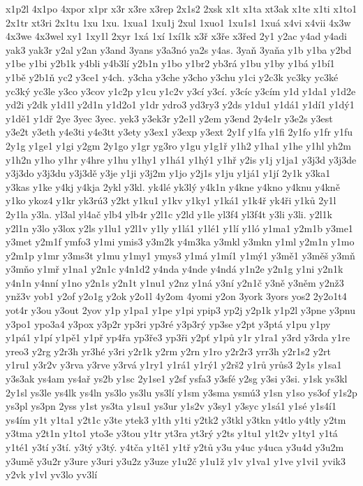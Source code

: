 x1p2l
4x1po
4xpor
x1pr
x3r
x3re
x3rep
2x1s2
2xsk
x1t
x1ta
xt3ak
x1te
x1ti
x1to1
2x1tr
xt3ri
2x1tu
1xu
1xu.
1xua1
1xu1j
2xul
1xuo1
1xu1s1
1xuá
x4vi
x4vii
4x3w
4x3we
4x3wel
xy1
1xy1l
2xyr
1xá
1xí
1xí1k
x3ř
x3ře
x3řed
2y1
y2ac
y4ad
y4adi
yak3
yak3r
y2al
y2an
y3and
3yans
y3a3nó
ya2s
y4as.
3yaň
3yaňa
y1b
y1ba
y2bd
y1be
y1bi
y2b1k
y4bli
y4b3lí
y2b1n
y1bo
y1br2
yb3rá
y1bu
y1by
y1bá
y1bí1
y1bě
y2b1ň
yc2
y3ce1
y4ch.
y3cha
y3che
y3cho
y3chu
y1ci
y2c3k
yc3ky
yc3ké
yc3ký
yc3le
y3co
y3cov
y1c2p
y1cu
y1c2v
y3cí
y3cí.
y3cíc
y3cím
y1d
y1da1
y1d2e
yd2i
y2dk
y1d1l
y2d1n
y1d2o1
y1dr
ydro3
yd3ry3
y2ds
y1du1
y1dá1
y1dí1
y1dý1
y1dě1
y1dř
2ye
3yec
3yec.
yek3
y3ek3r
y2e1l
y2em
y3end
2y4e1r
y3e2s
y3est
y3e2t
y3eth
y4e3ti
y4e3tt
y3ety
y3ex1
y3exp
y3ext
2y1f
y1fa
y1fi
2y1fo
y1fr
y1fu
2y1g
y1ge1
y1gi
y2gm
2y1go
y1gr
yg3ro
y1gu
y1g1ř
y1h2
y1ha1
y1he
y1hl
yh2m
y1h2n
y1ho
y1hr
y4hre
y1hu
y1hy1
y1há1
y1hý1
y1hř
y2is
y1j
y1ja1
y3j3d
y3j3de
y3j3do
y3j3du
y3j3dě
y3je
y1ji
y3j2m
y1jo
y2j1s
y1ju
y1já1
y1jí
2y1k
y3ka1
y3kas
y1ke
y4kj
y4kja
2ykl
y3kl.
yk4lé
yk3lý
y4k1n
y4kne
y4kno
y4knu
y4kně
y1ko
ykoz4
y1kr
yk3rú3
y2kt
y1ku1
y1kv
y1ky1
y1ká1
y1k4ř
yk4ři
y1ků
2y1l
2y1la
y3la.
yl3al
yl4ač
ylb4
ylb4r
y2l1c
y2ld
y1le
yl3f4
yl3f4t
y3li
y3li.
y2l1k
y2l1n
y3lo
y3lox
y2ls
y1lu1
y2l1v
y1ly
y1lá1
y1lé1
y1lí
y1ló
y1ma1
y2m1b
y3me1
y3met
y2m1f
ymfo3
y1mi
ymis3
y3m2k
y4m3ka
y3mkl
y3mkn
y1ml
y2m1n
y1mo
y2m1p
y1mr
y3ms3t
y1mu
y1my1
ymys3
y1má
y1mí1
y1mý1
y3mě1
y3měš
y3mň
y3mňo
y1mř
y1na1
y2n1c
y4n1d2
y4nda
y4nde
y4ndá
y1n2e
y2n1g
y1ni
y2n1k
y4n1n
y4nní
y1no
y2n1s
y2n1t
y1nu1
y2nz
y1ná
y3ní
y2n1č
y3ně
y3něm
y2nž3
ynž3v
yob1
y2of
y2o1g
y2ok
y2o1l
4y2om
4yomi
y2on
3york
3yors
yos2
2y2o1t4
yot4r
y3ou
y3out
2yov
y1p
y1pa1
y1pe
y1pi
ypip3
yp2j
y2p1k
y1p2l
y3pne
y3pnu
y3po1
ypo3a4
y3pox
y3p2r
yp3ri
yp3ré
y3p3rý
yp3se
y2pt
y3ptá
y1pu
y1py
y1pá1
y1pí
y1pě1
y1př
yp4řa
yp3ře3
yp3ři
y2pť
y1pů
y1r
y1ra1
y3rd
y3rda
y1re
yreo3
y2rg
y2r3h
yr3hé
y3ri
y2r1k
y2rm
y2rn
y1ro
y2r2r3
yrr3h
y2r1s2
y2rt
y1ru1
y3r2v
y3rva
y3rve
y3rvá
y1ry1
y1rá1
y1rý1
y2rš2
y1rů
yrůs3
2y1s
y1sa1
y3s3ak
ys4am
ys4ař
ys2b
y1sc
2y1se1
y2sf
ysfa3
y3sfé
y2sg
y3si
y3si.
y1sk
ys3kl
2y1sl
ys3le
ys4lk
ys4ln
ys3lo
ys3lu
ys3lí
y1sm
y3sma
ysmú3
y1sn
y1so
ys3of
y1s2p
ys3pl
ys3pn
2yss
y1st
ys3ta
y1su1
ys3ur
y1s2v
y3sy1
y3syc
y1sá1
y1sé
y1s4í1
ys4ím
y1t
y1ta1
y2t1c
y3te
ytek3
y1th
y1ti
y2tk2
y3tkl
y3tkn
y4tlo
y4tly
y2tm
y3tma
y2t1n
y1to1
yto3e
y3tou
y1tr
yt3ra
yt3rý
y2ts
y1tu1
y1t2v
y1ty1
y1tá
y1té1
y3tí
y3tí.
y3tý
y3tý.
y4tča
y1tě1
y1tř
y2tů
y3u
y4uc
y4uca
y3u4d
y3u2m
y3umě
y3u2r
y3ure
y3uri
y3u2z
y3uze
y1u2č
y1u1ž
y1v
y1va1
y1ve
y1vi1
yvik3
y2vk
y1vl
yv3lo
yv3lí
